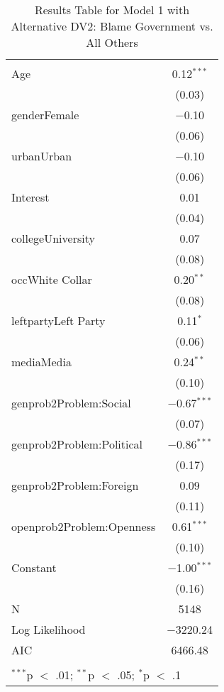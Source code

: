 
\begin{table}[!htbp] \centering 
  \caption{Results Table for Model 1 with Alternative DV2: Blame Government vs. All Others} 
  \label{} 
\footnotesize 
\begin{tabular}{@{\extracolsep{5pt}}lc} 
\\[-1.8ex]\hline \\[-1.8ex] 
\hline \\[-1.8ex] 
 Age & 0.12$^{***}$ \\ 
  & (0.03) \\ 
  genderFemale & $-$0.10 \\ 
  & (0.06) \\ 
  urbanUrban & $-$0.10 \\ 
  & (0.06) \\ 
  Interest & 0.01 \\ 
  & (0.04) \\ 
  collegeUniversity & 0.07 \\ 
  & (0.08) \\ 
  occWhite Collar & 0.20$^{**}$ \\ 
  & (0.08) \\ 
  leftpartyLeft Party & 0.11$^{*}$ \\ 
  & (0.06) \\ 
  mediaMedia & 0.24$^{**}$ \\ 
  & (0.10) \\ 
  genprob2Problem:Social & $-$0.67$^{***}$ \\ 
  & (0.07) \\ 
  genprob2Problem:Political & $-$0.86$^{***}$ \\ 
  & (0.17) \\ 
  genprob2Problem:Foreign & 0.09 \\ 
  & (0.11) \\ 
  openprob2Problem:Openness & 0.61$^{***}$ \\ 
  & (0.10) \\ 
  Constant & $-$1.00$^{***}$ \\ 
  & (0.16) \\ 
 N & 5148 \\ 
Log Likelihood & $-$3220.24 \\ 
AIC & 6466.48 \\ 
\hline \\[-1.8ex] 
\multicolumn{2}{l}{$^{***}$p $<$ .01; $^{**}$p $<$ .05; $^{*}$p $<$ .1} \\ 
\end{tabular} 
\end{table} 
